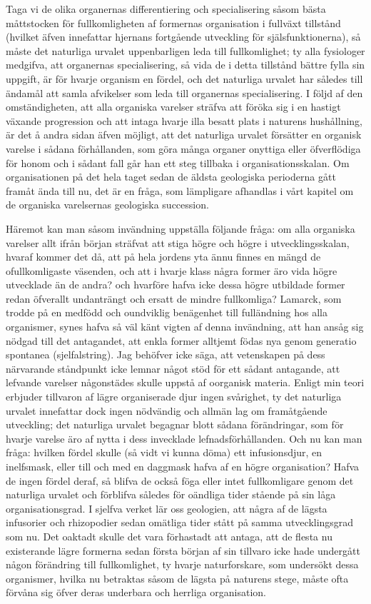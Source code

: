 Taga vi de olika organernas differentiering och specialisering såsom bästa måttstocken för fullkomligheten af formernas organisation i fullväxt tillstånd (hvilket äfven innefattar hjernans fortgående utveckling för själsfunktionerna), så måste det naturliga urvalet uppenbarligen leda till fullkomlighet; ty alla fysiologer medgifva, att organernas specialisering, så vida de i detta tillstånd bättre fylla sin uppgift, är för hvarje organism en fördel, och det naturliga urvalet har således till ändamål att samla afvikelser som leda till organernas specialisering. I följd af den omständigheten, att alla organiska varelser sträfva att föröka sig i en hastigt växande progression och att intaga hvarje illa besatt plats i naturens hushållning, är det å andra sidan äfven möjligt, att det naturliga urvalet försätter en organisk varelse i sådana förhållanden, som göra många organer onyttiga eller öfverflödiga för honom och i sådant fall går han ett steg tillbaka i organisationsskalan. Om organisationen på det hela taget sedan de äldsta geologiska perioderna gått framåt ända till nu, det är en fråga, som lämpligare afhandlas i vårt kapitel om de organiska varelsernas geologiska succession.

Häremot kan man såsom invändning uppställa följande fråga: om alla organiska varelser allt ifrån början sträfvat att stiga högre och högre i utvecklingsskalan, hvaraf kommer det då, att på hela jordens yta ännu finnes en mängd de ofullkomligaste väsenden, och att i hvarje klass några former äro vida högre utvecklade än de andra? och hvarföre hafva icke dessa högre utbildade former redan öfverallt undanträngt och ersatt de mindre fullkomliga? Lamarck, som trodde på en medfödd och oundviklig benägenhet till fulländning hos alla organismer, synes hafva så väl känt vigten af denna invändning, att han ansåg sig nödgad till det antagandet, att enkla former alltjemt födas nya genom generatio spontanea (sjelfalstring). Jag behöfver icke säga, att vetenskapen på dess närvarande ståndpunkt icke lemnar något stöd för ett sådant antagande, att lefvande varelser någonstädes skulle uppstå af oorganisk materia. Enligt min teori erbjuder tillvaron af lägre organiserade djur ingen svårighet, ty det naturliga urvalet innefattar dock ingen nödvändig och allmän lag om framåtgående utveckling; det naturliga urvalet begagnar blott sådana förändringar, som för hvarje varelse äro af nytta i dess invecklade lefnadsförhållanden. Och nu kan man fråga: hvilken fördel skulle (så vidt vi kunna döma) ett infusionsdjur, en inelfsmask, eller till och med en daggmask hafva af en högre organisation? Hafva de ingen fördel deraf, så blifva de också föga eller intet fullkomligare genom det naturliga urvalet och förblifva således för oändliga tider stående på sin låga organisationsgrad. I sjelfva verket lär oss geologien, att några af de lägsta infusorier och rhizopodier sedan omätliga tider stått på samma utvecklingsgrad som nu. Det oaktadt skulle det vara förhastadt att antaga, att de flesta nu existerande lägre formerna sedan första början af sin tillvaro icke hade undergått någon förändring till fullkomlighet, ty hvarje naturforskare, som undersökt dessa organismer, hvilka nu betraktas såsom de lägsta på naturens stege, måste ofta förvåna sig öfver deras underbara och herrliga organisation.

